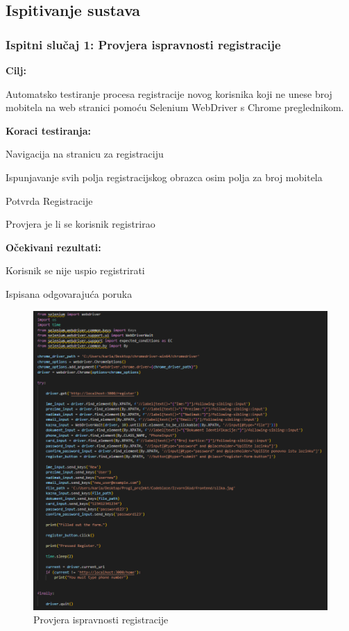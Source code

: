                        



			\subsection{Ispitivanje sustava}



			\subsubsection{Ispitni slučaj 1: Provjera ispravnosti registracije}
			
			
			\noindent\textbf{Cilj:}
			\begin{packed_item}
				\item Automatsko testiranje procesa registracije novog korisnika koji ne unese broj mobitela na web stranici pomoću Selenium WebDriver s Chrome preglednikom.
			\end{packed_item}
			
			\noindent\textbf{Koraci testiranja:}
			\begin{packed_item}
				\item Navigacija na stranicu za registraciju
				\item Ispunjavanje svih polja registracijskog obrazca osim polja za broj mobitela
				\item  Potvrda Registracije
				\item  Provjera je li se korisnik registrirao
				
			\end{packed_item}
			\noindent\textbf{Očekivani rezultati:}
			\begin{packed_item}
				\item  Korisnik se nije uspio registrirati
				\item Ispisana odgovarajuća poruka
			\end{packed_item}


						\begin{figure} [H]
							\centering
							\includegraphics[width=0.7\linewidth]{slike/RegisterSelenium.png}
							\caption{Provjera ispravnosti registracije}
							\label{fig:Provjera ispravnosti registracije}
						\end{figure}
						

